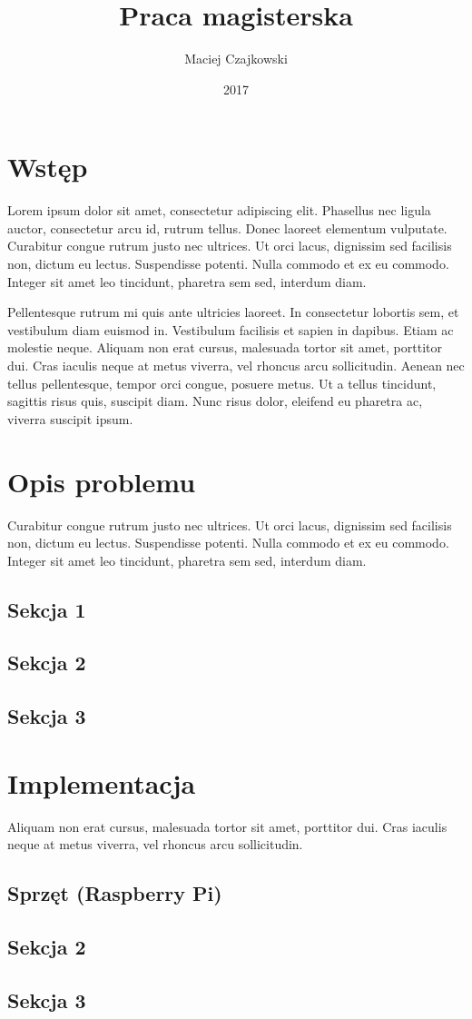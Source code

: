 \documentclass[wmii,inf,mgr]{uwmthesis}
\date{2017}
\title{Praca magisterska}
\author{Maciej Czajkowski}
\begin{document}
	
\maketitle
	
\tableofcontents

\chapter*{Wstęp}
Lorem ipsum dolor sit amet, consectetur adipiscing elit. Phasellus nec ligula auctor, consectetur arcu id, rutrum tellus. Donec laoreet elementum vulputate. Curabitur congue rutrum justo nec ultrices. Ut orci lacus, dignissim sed facilisis non, dictum eu lectus. Suspendisse potenti. Nulla commodo et ex eu commodo. Integer sit amet leo tincidunt, pharetra sem sed, interdum diam. 

Pellentesque rutrum mi quis ante ultricies laoreet. In consectetur lobortis sem, et vestibulum diam euismod in. Vestibulum facilisis et sapien in dapibus. Etiam ac molestie neque. Aliquam non erat cursus, malesuada tortor sit amet, porttitor dui. Cras iaculis neque at metus viverra, vel rhoncus arcu sollicitudin. Aenean nec tellus pellentesque, tempor orci congue, posuere metus. Ut a tellus tincidunt, sagittis risus quis, suscipit diam. Nunc risus dolor, eleifend eu pharetra ac, viverra suscipit ipsum.

\chapter{Opis problemu}
Curabitur congue rutrum justo nec ultrices. Ut orci lacus, dignissim sed facilisis non, dictum eu lectus. Suspendisse potenti. Nulla commodo et ex eu commodo. Integer sit amet leo tincidunt, pharetra sem sed, interdum diam.
\section{Sekcja 1}
\section{Sekcja 2}
\section{Sekcja 3}

\chapter{Implementacja}
Aliquam non erat cursus, malesuada tortor sit amet, porttitor dui. Cras iaculis neque at metus viverra, vel rhoncus arcu sollicitudin.
\section{Sprzęt (Raspberry Pi)}
\section{Sekcja 2}
\section{Sekcja 3}
\end{document}
